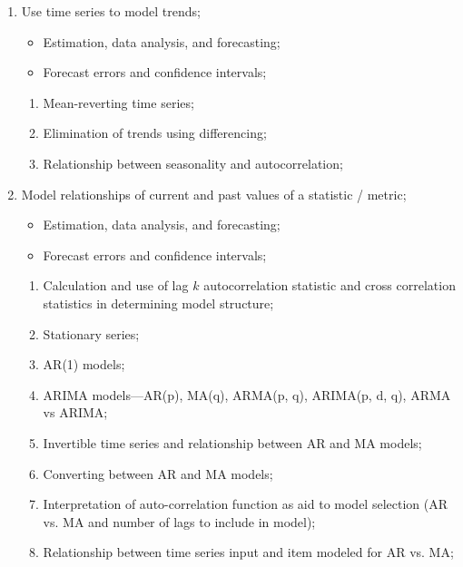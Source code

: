 \begin{outcomes}
\begin{enumerate}
	\item	Use time series to model trends;
		\begin{itemize}
		\item	Estimation, data analysis, and forecasting;
		\item	Forecast errors and confidence intervals;
		\end{itemize}
	\begin{knowledge}
	\begin{enumerate}
	\item	Mean-reverting time series;
	\item	Elimination of trends using differencing;
	\item	Relationship between seasonality and autocorrelation;
	\end{enumerate}
	\end{knowledge}
\tcbline
	\item	Model relationships of current and past values of a statistic / metric;
		\begin{itemize}
		\item	Estimation, data analysis, and forecasting;
		\item	Forecast errors and confidence intervals;
		\end{itemize}
	\begin{knowledge}
	\begin{enumerate}
	\item	Calculation and use of lag $k$ autocorrelation statistic and cross correlation statistics in determining model structure;
	\item	Stationary series;
	\item	AR(1) models;
	\item	ARIMA models---AR(p), MA(q), ARMA(p, q), ARIMA(p, d, q), ARMA vs ARIMA;
	\item	Invertible time series and relationship between AR and MA models;
	\item	Converting between AR and MA models;
	\item	Interpretation of auto-correlation function as aid to model selection (AR vs. MA and number of lags to include in model);
	\item	Relationship between time series input and item modeled for AR vs. MA;
	\end{enumerate}
	\end{knowledge}

\end{enumerate}
\end{outcomes}
